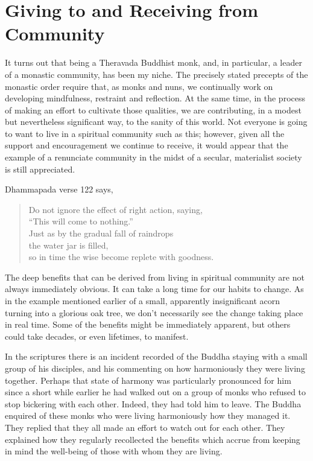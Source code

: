 \section{Giving to and Receiving from Community}

It turns out that being a Theravada Buddhist monk, and, in particular, a
leader of a monastic community, has been my niche. The precisely stated
precepts of the monastic order require that, as monks and nuns, we
continually work on developing mindfulness, restraint and reflection. At
the same time, in the process of making an effort to cultivate those
qualities, we are contributing, in a modest but \mbox{nevertheless} significant
way, to the sanity of this world. Not everyone is going to want to live
in a spiritual community such as this; however, given all the support
and encouragement we continue to receive, it would appear that the
example of a renunciate community in the midst of a secular, materialist
society is still appreciated.

Dhammapada verse 122 says,

\begin{quote}
  Do not ignore the effect of right action, saying,\\
  ``This will come to nothing.''\\
  Just as by the gradual fall of raindrops\\
  the water jar is filled,\\
  so in time the wise become replete with goodness.
\end{quote}

The deep benefits that can be derived from living in spiritual community
are not always immediately obvious. It can take a long time for our
habits to change. As in the example mentioned earlier of a small,
apparently insignificant acorn turning into a glorious oak tree, we
don't necessarily see the change taking place in real time. Some of the
benefits might be immediately apparent, but others could take decades,
or even lifetimes, to manifest.

In the scriptures there is an incident recorded of the Buddha staying
with a small group of his disciples, and his commenting on how
harmoniously they were living together. Perhaps that state of harmony
was particularly pronounced for him since a short while earlier he had
walked out on a group of monks who refused to stop bickering with each
other. Indeed, they had told him to leave. The Buddha enquired of these
monks who were living harmoniously how they managed it. They replied
that they all made an effort to watch out for each other. They explained
how they regularly recollected the benefits which accrue from keeping in
mind the well-being of those with whom they are living.

